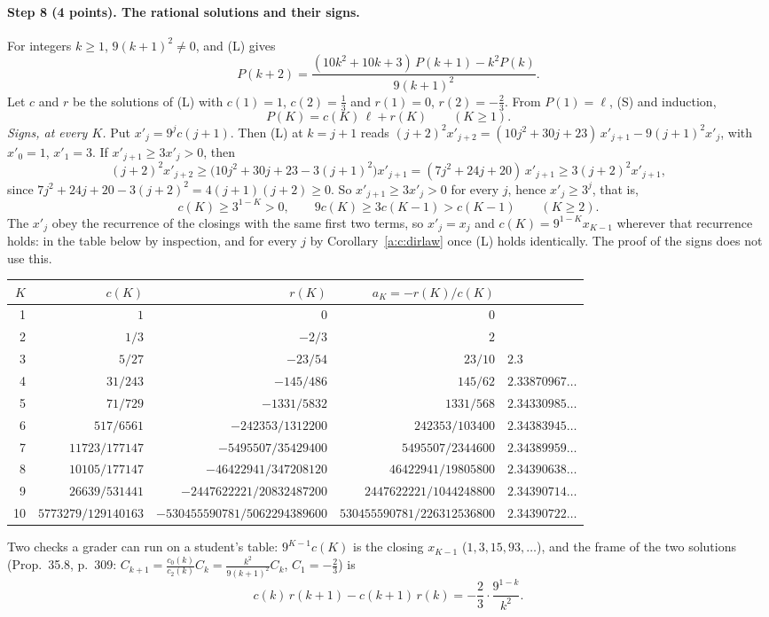 \documentclass[11pt]{article}
\theoremstyle{plain}
\theoremstyle{definition}
\theoremstyle{remark}
\begin{document}
\paragraph{Step 8 (4 points). The rational solutions and their signs.}
For integers $k\ge1$, $9(k+1)^2\neq0$, and (L) gives
\[
P(k+2)=\frac{(10k^2+10k+3)\,P(k+1)-k^2P(k)}{9(k+1)^2}.
\]
Let $c$ and $r$ be the solutions of (L) with $c(1)=1$, $c(2)=\frac13$ and $r(1)=0$, $r(2)=-\frac23$. From $P(1)=\ell$, (S) and induction,
\[
P(K)=c(K)\,\ell+r(K)\qquad(K\ge1).
\]
\emph{Signs, at every $K$.} Put $x'_j=9^jc(j+1)$. Then (L) at $k=j+1$ reads $(j+2)^2x'_{j+2}=(10j^2+30j+23)\,x'_{j+1}-9(j+1)^2x'_j$, with $x'_0=1$, $x'_1=3$. If $x'_{j+1}\ge3x'_j>0$, then
\[
(j+2)^2x'_{j+2}\ge\big(10j^2+30j+23-3(j+1)^2\big)x'_{j+1}=(7j^2+24j+20)\,x'_{j+1}\ge3(j+2)^2x'_{j+1},
\]
since $7j^2+24j+20-3(j+2)^2=4(j+1)(j+2)\ge0$. So $x'_{j+1}\ge3x'_j>0$ for every $j$, hence $x'_j\ge3^j$, that is,
\[
c(K)\ge3^{1-K}>0,\qquad 9c(K)\ge3c(K-1)>c(K-1)\qquad(K\ge2).
\]
The $x'_j$ obey the recurrence of the closings with the same first two terms, so $x'_j=x_j$ and $c(K)=9^{1-K}x_{K-1}$ wherever that recurrence holds: in the table below by inspection, and for every $j$ by Corollary~\ref{a:c:dirlaw} once (L) holds identically. The proof of the signs does not use this.

\begin{center}
\small
\renewcommand{\arraystretch}{1.12}
\begin{tabular}{@{}r r r r l@{}}
\toprule
$K$ & $c(K)$ & $r(K)$ & $a_K=-r(K)/c(K)$ & \\ \midrule
1 & $1$ & $0$ & $0$ & \\
2 & $1/3$ & $-2/3$ & $2$ & \\
3 & $5/27$ & $-23/54$ & $23/10$ & $2.3$\\
4 & $31/243$ & $-145/486$ & $145/62$ & $2.33870967\ldots$\\
5 & $71/729$ & $-1331/5832$ & $1331/568$ & $2.34330985\ldots$\\
6 & $517/6561$ & $-242353/1312200$ & $242353/103400$ & $2.34383945\ldots$\\
7 & $11723/177147$ & $-5495507/35429400$ & $5495507/2344600$ & $2.34389959\ldots$\\
8 & $10105/177147$ & $-46422941/347208120$ & $46422941/19805800$ & $2.34390638\ldots$\\
9 & $26639/531441$ & $-2447622221/20832487200$ & $2447622221/1044248800$ & $2.34390714\ldots$\\
10 & $5773279/129140163$ & $-530455590781/5062294389600$ & $530455590781/226312536800$ & $2.34390722\ldots$\\
\bottomrule
\end{tabular}
\end{center}
Two checks a grader can run on a student's table: $9^{K-1}c(K)$ is the closing $x_{K-1}$ ($1,3,15,93,\dots$), and the frame of the two solutions (Prop.~35.8, p.~309: $C_{k+1}=\frac{c_0(k)}{c_2(k)}C_k=\frac{k^2}{9(k+1)^2}C_k$, $C_1=-\frac23$) is
\[
c(k)\,r(k+1)-c(k+1)\,r(k)=-\frac23\cdot\frac{9^{1-k}}{k^2} .
\]
\end{document}
